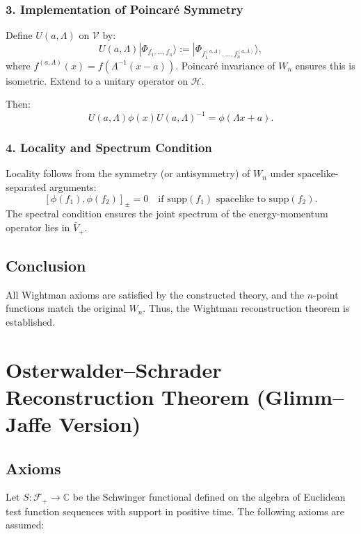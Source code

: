 \documentclass{article}
\begin{document}
\subsubsection{3. Implementation of Poincaré Symmetry}

Define $U(a, \Lambda)$ on $\mathscr{V}$ by:
\[
U(a, \Lambda) |\Phi_{f_1, \dots, f_n}\rangle := |\Phi_{f_1^{(a,\Lambda)}, \dots, f_n^{(a,\Lambda)}}\rangle,
\]
where $f^{(a,\Lambda)}(x) = f(\Lambda^{-1}(x - a))$. Poincaré invariance of $W_n$ ensures this is isometric. Extend to a unitary operator on $\mathcal{H}$.

Then:
\[
U(a, \Lambda) \phi(x) U(a, \Lambda)^{-1} = \phi(\Lambda x + a).
\]

\subsubsection{4. Locality and Spectrum Condition}

Locality follows from the symmetry (or antisymmetry) of $W_n$ under spacelike-separated arguments:
\[
[\phi(f_1), \phi(f_2)]_\pm = 0 \quad \text{if } \text{supp}(f_1) \text{ spacelike to } \text{supp}(f_2).
\]
The spectral condition ensures the joint spectrum of the energy-momentum operator lies in $\bar{V}_+$.

\subsection*{Conclusion}

All Wightman axioms are satisfied by the constructed theory, and the $n$-point functions match the original $W_n$. Thus, the Wightman reconstruction theorem is established.


\section{Osterwalder--Schrader Reconstruction Theorem (Glimm--Jaffe Version)}

\subsection*{Axioms}

Let $S: \mathcal{F}_+ \to \mathbb{C}$ be the Schwinger functional defined on the algebra of Euclidean test function sequences with support in positive time. The following axioms are assumed:
\end{document}
